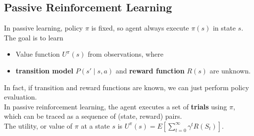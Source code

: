\documentclass[12pt]{article}
\theoremstyle{definition}
\begin{document}
\subsection{Passive Reinforcement Learning}
In passive learning, policy $\pi$ is fixed, so agent always execute $\pi(s)$ in state $s$. The goal is to learn
\begin{itemize}
	\item Value function $U^{\pi}(s)$ from observations, where
	\item \textbf{transition model} $P(s'\mid s,a)$ and \textbf{reward function} $R(s)$ are unknown.
\end{itemize}
In fact, if transition and reward functions are known, we can just perform policy evaluation.\\
In passive reinforcement learning, the agent executes a set of \textbf{trials} using $\pi$, which can be traced as a sequence of (state, reward) pairs.\\
The utility, or value of $\pi$ at a state $s$ is $U^{\pi}(s)=E[\sum_{t=0}^\infty \gamma^tR(S_t)]$.
\end{document}
